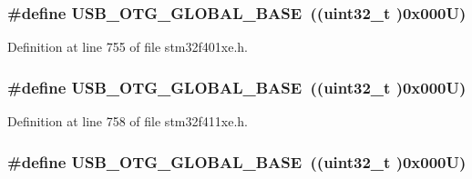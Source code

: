 \subsubsection[{\texorpdfstring{U\+S\+B\+\_\+\+O\+T\+G\+\_\+\+G\+L\+O\+B\+A\+L\+\_\+\+B\+A\+SE}{USB_OTG_GLOBAL_BASE}}]{\setlength{\rightskip}{0pt plus 5cm}\#define U\+S\+B\+\_\+\+O\+T\+G\+\_\+\+G\+L\+O\+B\+A\+L\+\_\+\+B\+A\+SE~((uint32\+\_\+t )0x000\+U)}\hypertarget{group___peripheral__registers__structures_ga044aa4388e72d9d47a03f387fb8926fb}{}\label{group___peripheral__registers__structures_ga044aa4388e72d9d47a03f387fb8926fb}


Definition at line 755 of file stm32f401xe.\+h.

\subsubsection[{\texorpdfstring{U\+S\+B\+\_\+\+O\+T\+G\+\_\+\+G\+L\+O\+B\+A\+L\+\_\+\+B\+A\+SE}{USB_OTG_GLOBAL_BASE}}]{\setlength{\rightskip}{0pt plus 5cm}\#define U\+S\+B\+\_\+\+O\+T\+G\+\_\+\+G\+L\+O\+B\+A\+L\+\_\+\+B\+A\+SE~((uint32\+\_\+t )0x000\+U)}\hypertarget{group___peripheral__registers__structures_ga044aa4388e72d9d47a03f387fb8926fb}{}\label{group___peripheral__registers__structures_ga044aa4388e72d9d47a03f387fb8926fb}


Definition at line 758 of file stm32f411xe.\+h.

\subsubsection[{\texorpdfstring{U\+S\+B\+\_\+\+O\+T\+G\+\_\+\+G\+L\+O\+B\+A\+L\+\_\+\+B\+A\+SE}{USB_OTG_GLOBAL_BASE}}]{\setlength{\rightskip}{0pt plus 5cm}\#define U\+S\+B\+\_\+\+O\+T\+G\+\_\+\+G\+L\+O\+B\+A\+L\+\_\+\+B\+A\+SE~((uint32\+\_\+t )0x000\+U)}\hypertarget{group___peripheral__registers__structures_ga044aa4388e72d9d47a03f387fb8926fb}{}\label{group___peripheral__registers__structures_ga044aa4388e72d9d47a03f387fb8926fb}


